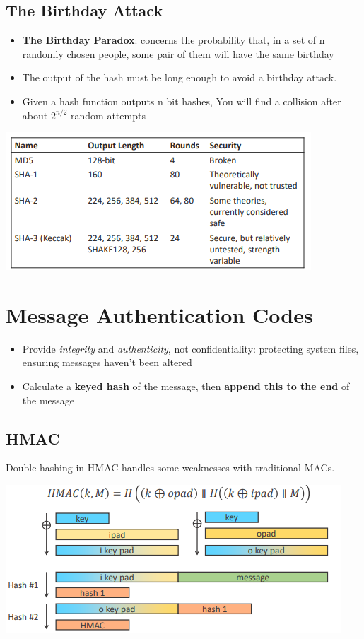 \documentclass{article}
\begin{document}
\subsection{The Birthday Attack}
\begin{itemize}
  \item \textbf{The Birthday Paradox}: concerns the probability that, in a set of n randomly chosen people, some pair of them will have the same birthday
  \item The output of the hash must be long enough to avoid a birthday attack.
  \item Given a hash function outputs n bit hashes, You will find a collision after about $ 2^{n/2}$ random attempts
\end{itemize}
\begin{center}
  \includegraphics{hash_examples.png}
\end{center}

\section{Message Authentication Codes}
\begin{itemize}
  \item Provide \textit{integrity} and \textit{authenticity}, not confidentiality: protecting system files, ensuring messages haven’t been altered 
  \item Calculate a \textbf{keyed hash} of the message, then \textbf{append this to the end} of the message
\end{itemize}

\subsection{HMAC}
\begin{flushleft}
Double hashing in HMAC handles some weaknesses with traditional MACs.
\end{flushleft}
\begin{center}
  \includegraphics{hmac.png}
\end{center}
\end{document}
